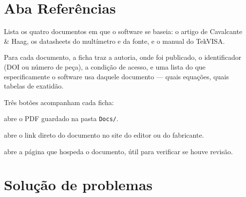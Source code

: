 \documentclass[11pt,a4paper]{article}
\newcommand{\botao}[1]{\textsf{[#1]}}
\begin{document}
\section{Aba Referências}

Lista os quatro documentos em que o software se baseia: o artigo de Cavalcante
\& Haag, os datasheets do multímetro e da fonte, e o manual do TekVISA.

Para cada documento, a ficha traz a autoria, onde foi publicado, o
identificador (DOI ou número de peça), a condição de acesso, e uma lista do que
especificamente o software usa daquele documento --- quais equações, quais
tabelas de exatidão.

Três botões acompanham cada ficha:

\begin{description}[style=nextline,leftmargin=0.6cm,nosep]
  \item[\botao{Abrir cópia local}] abre o PDF guardado na pasta \texttt{Docs/}.
  \item[\botao{Abrir documento oficial}] abre o link direto do documento no
        site do editor ou do fabricante.
  \item[\botao{Página do editor/fabricante}] abre a página que hospeda o
        documento, útil para verificar se houve revisão.
\end{description}

\section{Solução de problemas}
\end{document}
